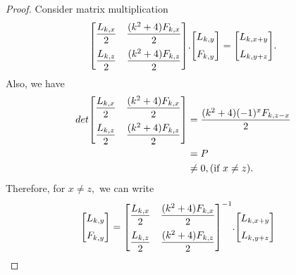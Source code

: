 \begin{proof}
Consider matrix multiplication
$${
 \begin{bmatrix}{}
    \dfrac{L_{k,x}}{2} & \dfrac{(k^2+4)F_{k,x}}{2}\vspace{.2cm} \\
    \dfrac{L_{k,z}}{2} & \dfrac{(k^2+4)F_{k,z}}{2} \\
	\end{bmatrix}
	}.{
 \begin{bmatrix}{}
    L_{k,y} \vspace{.2cm}\\
    F_{k,y} \\
	\end{bmatrix}
	}={
 \begin{bmatrix}{}
    L_{k,x+y}\vspace{.2cm} \\
    L_{k,y+z} \\
	\end{bmatrix}
	}.$$
	Also, we have	
	\begin{align*}
	det{
 \begin{bmatrix}{}
    \dfrac{L_{k,x}}{2} & \dfrac{(k^2+4)F_{k,x}}{2}\vspace{.2cm} \\
    \dfrac{L_{k,z}}{2} & \dfrac{(k^2+4)F_{k,z}}{2} \\
	\end{bmatrix}
	}&=\dfrac{(k^2+4)(-1)^xF_{k,z-x}}{2}\\
					&=P\\
					&\neq0,\text{(if $x\neq z$)}.
	\end{align*}
	Therefore, for $x\neq z,$ we can write
	\begin{align*}
	{
 \begin{bmatrix}{}
    L_{k,y}\vspace{.2cm} \\
    F_{k,y} \\
	\end{bmatrix}
	}&={
 \begin{bmatrix}{}
    \dfrac{L_{k,x}}{2} & \dfrac{(k^2+4)F_{k,x}}{2}\vspace{.2cm} \\
    \dfrac{L_{k,z}}{2} & \dfrac{(k^2+4)F_{k,z}}{2} \\
	\end{bmatrix}
	^{-1}}.{
 \begin{bmatrix}{}
    L_{k,x+y}\vspace{.2cm} \\
    L_{k,y+z} \\

\end{bmatrix}}
\end{align*}
\end{proof}
